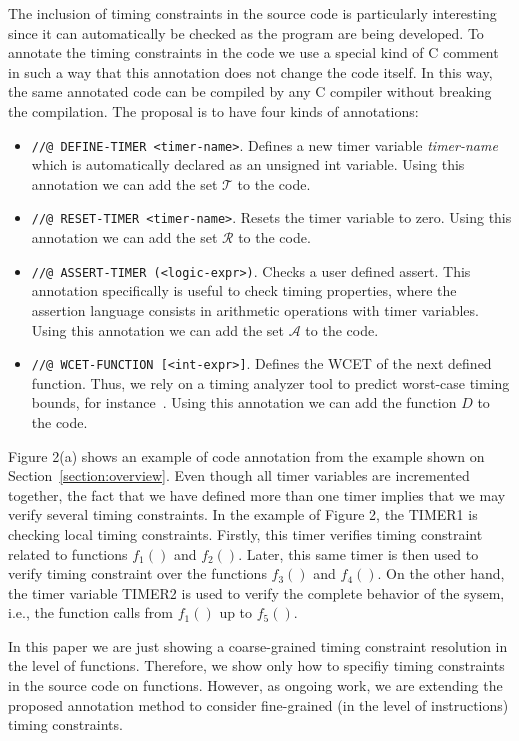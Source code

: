 \documentclass{llncs}
\begin{document}
The inclusion of timing constraints in the source code is particularly interesting since it can automatically be checked as the 
program are being developed. 
To annotate the timing constraints in the code we use a special kind of C comment in such a way that this annotation does not change 
the code itself. 
In this way, the same annotated code can be compiled by any C compiler without breaking the compilation. 
The proposal is to have four kinds of annotations:
\begin{itemize}
 \item {\tt //@ DEFINE-TIMER <timer-name>}. Defines a new timer variable 
   \emph{timer-name} which is automatically declared as an unsigned int variable.
    Using this annotation we can add the set $\mathcal{T}$ to the code.
 \item {\tt //@ RESET-TIMER <timer-name>}. Resets the timer variable to zero. 
    Using this annotation we can add the set $\mathcal{R}$ to the code.
 \item {\tt //@ ASSERT-TIMER (<logic-expr>)}. Checks a user defined assert. 
  This annotation specifically is useful to check timing properties, 
where the assertion language consists in arithmetic operations with timer variables.
    Using this annotation we can add the set $\mathcal{A}$ to the code.
 \item {\tt //@ WCET-FUNCTION [<int-expr>]}. Defines the WCET of the next defined function. 
  Thus, we rely on a timing analyzer tool to predict worst-case timing bounds, for instance~\cite{Bygde09}.
    Using this annotation we can add the function $D$ to the code.
\end{itemize}
Figure 2(a) shows an example of code annotation from the example shown 
on Section~\ref{section:overview}.
Even though all timer variables are incremented together, the fact that we have defined more than one timer
implies that we may verify several timing constraints. 
In the example of Figure 2, the TIMER1 is checking local timing constraints.
Firstly, this timer verifies timing constraint related to functions $f_1()$ and $f_2()$. 
Later, this same timer is then used to verify timing constraint over the functions $f_3()$ and $f_4()$. 
On the other hand, the timer variable TIMER2 is used to verify the complete behavior of the sysem, i.e.,
the function calls from $f_1()$ up to $f_5()$.

In this paper we are just showing a coarse-grained timing constraint resolution in the level of functions. 
Therefore, we show only how to specifiy timing constraints in the source code on functions. 
However, as ongoing work, we are extending the proposed annotation method to consider fine-grained 
(in the level of instructions) timing constraints.
\end{document}

